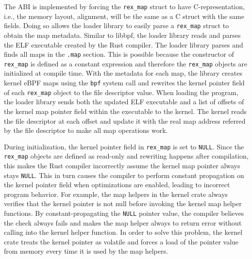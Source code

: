 The ABI is implemented by forcing the \texttt{rex\_map} struct to have
    C-representation, i.e., the memory layout, alignment, will be the same as
    a C struct with the same fields.
Doing so allows the \projname{} loader library to easily parse a
    \texttt{rex\_map} struct to obtain the map metadata.
Similar to libbpf, the \projname{} loader library reads and parses the ELF
    executable created by the Rust compiler.
The loader library parses and finds all maps in the \texttt{.map} section.
This is possible because the constructor of \texttt{rex\_map} is defined as
    a constant expression and therefore the \texttt{rex\_map} objects are
    initialized at compile time.
With the metadata for each map, the library creates kernel eBPF maps using the
    \texttt{bpf} system call and rewrites the kernel pointer field of each
    \texttt{rex\_map} object to the file descriptor value.
When loading the program, the loader library sends both the updated ELF
    executable and a list of offsets of the kernel map pointer field within the
    executable to the kernel.
The kernel reads the file descriptor at each offset and update it with the real
    map address referred by the file descriptor to make all map operations
    work.

During initialization, the kernel pointer field in \texttt{rex\_map} is set
    to \texttt{NULL}.
Since the \texttt{rex\_map} objects are defined as read-only and rewriting
    happens after compilation, this makes the Rust compiler incorrectly assume
    the kernel map pointer always stays \texttt{NULL}.
This in turn causes the compiler to perform constant propagation on the kernel
    pointer field when optimizations are enabled, leading to incorrect program
    behavior.
For example, the \projname{} map helpers in the \projname{} kernel crate always
    verifies that the kernel pointer is not null before invoking the kernel map
    helper functions.
By constant-propagating the \texttt{NULL} pointer value, the compiler believes
    the check always fails and makes the map helper always to return error
    without calling into the kernel helper function.
In order to solve this problem, the \projname{} kernel crate treats the kernel
    pointer as volatile and forces a load of the pointer value from memory
    every time it is used by the map helpers.

